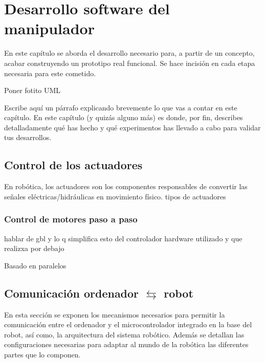 \chapter{Desarrollo software del manipulador}
\label{cap:capitulo6}

\vspace{1cm}

En este capítulo se aborda el desarrollo necesario para, a partir de un concepto, acabar construyendo un prototipo real funcional. Se 
hace incisión en cada etapa necesaria para este cometido.

Poner fotito UML 

Escribe aquí un párrafo explicando brevemente lo que vas a contar en este capítulo. En este capítulo (y quizás alguno más) es donde, por fin, describes detalladamente qué has hecho y qué experimentos has llevado a cabo para validar tus desarrollos.

\section{Control de los actuadores}
En robótica, los actuadores son los componentes responsables de convertir las señales eléctricas/hidráulicas en movimiento físico. 
tipos de actuadores

\subsection{Control de motores paso a paso}
\label{subsec:control_pap}
hablar de gbl y lo q simplifica esto
del controlador hardware utilizado y que realizxa por debajo

Basado en paralelos

\section{Comunicación ordenador $\leftrightarrows$ robot}
En esta sección se exponen los mecanismos necesarios para permitir la comunicación entre el ordenador y el microcontrolador 
integrado en la base del robot, así como, la arquitectura del sistema robótico. Además se detallan las configuraciones necesarias 
para adaptar al mundo de la robótica las diferentes partes que lo componen.

